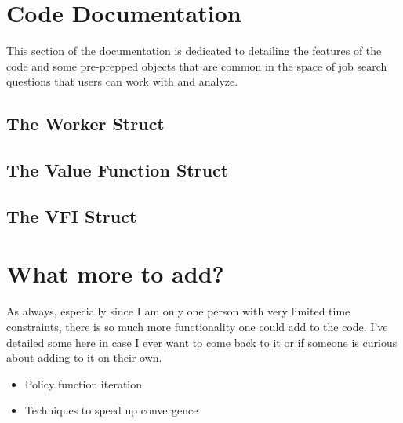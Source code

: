 \documentclass[11pt,english]{article}
\begin{document}
\section{Code Documentation}

This section of the documentation is dedicated to detailing the features of the code and some pre-prepped objects that are common in the space of job search questions that users can work with and analyze.

\subsection{The Worker Struct}

\subsection{The Value Function Struct}

\subsection{The VFI Struct}

\section{What more to add?}

As always, especially since I am only one person with very limited time constraints, there is so much more functionality one could add to the code. I've detailed some here in case I ever want to come back to it or if someone is curious about adding to it on their own.
\begin{itemize}
	\item Policy function iteration

	\item Techniques to speed up convergence

\end{itemize}
\end{document}
